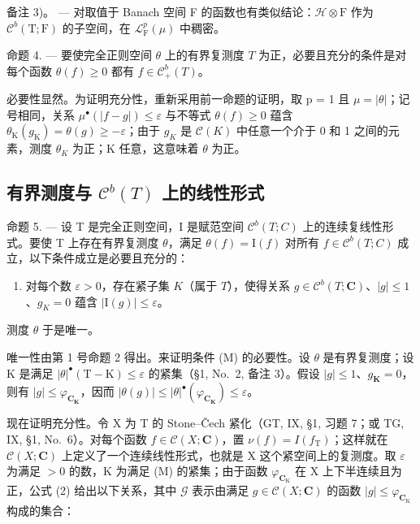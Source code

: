备注 3)。 --- 对取值于 Banach 空间 F 的函数也有类似结论：\(\mathcal{H} \otimes \mathrm{F}\) 作为 \(\mathcal{C}^b (\mathrm{T};\mathrm{F})\) 的子空间，在 \(\mathcal{L}_{\mathrm{F}}^{p}(\mu)\) 中稠密。

命题 4. --- 要使完全正则空间 \(\theta\) 上的有界复测度 \(T\) 为正，必要且充分的条件是对每个函数 \(\theta(f) \geqslant 0\) 都有 \(f \in \mathcal{C}_{+}^{b}(T)\)。

必要性显然。为证明充分性，重新采用前一命题的证明，取 p = 1 且 \(\mu = |\theta|\)；记号相同，关系 \(\mu^{\bullet}(|f - g|) \leqslant \varepsilon\) 与不等式 \(\theta(f) \geqslant 0\) 蕴含 \(\theta_{\mathrm{K}}(g_{\mathrm{K}}) = \theta(g) \geqslant -\varepsilon\)；由于 \(g_{K}\) 是 \(\mathcal{C}(K)\) 中任意一个介于 0 和 1 之间的元素，测度 \(\theta_{K}\) 为正；K 任意，这意味着 \(\theta\) 为正。

\subsection{\texorpdfstring{有界测度与 \(\mathcal{C}^{b}(T)\) 上的线性形式}{有界测度与 \textbackslash mathcal\{C\}\^{}\{b\}(T) 上的线性形式}}

命题 5. --- 设 T 是完全正则空间，I 是赋范空间 \(\mathcal{C}^{b}(T;C)\) 上的连续复线性形式。要使 T 上存在有界复测度 \(\theta\)，满足 \(\theta(f)=\mathrm{I}(f)\) 对所有 \(f\in\mathcal{C}^{b}(T;C)\) 成立，以下条件成立是必要且充分的：

\begin{enumerate}
\def\labelenumi{(\Alph{enumi})}
\setcounter{enumi}{12}
\tightlist
\item
  对每个数 \(\varepsilon > 0\)，存在紧子集 \(K\)（属于 \(T\)），使得关系 \(g \in \mathcal{C}^b(T; \mathbf{C})\)、\(|g| \leqslant 1\)、\(g_K = 0\) 蕴含 \(|\mathrm{I}(g)| \leqslant \varepsilon\)。
\end{enumerate}

测度 \(\theta\) 于是唯一。

唯一性由第 1 号命题 2 得出。来证明条件 (M) 的必要性。设 \(\theta\) 是有界复测度；设 K 是满足 \(|\theta|^{\bullet}(\mathrm{T}-\mathrm{K}) \leqslant \varepsilon\) 的紧集（§1, No.~2, 备注 3）。假设 \(|g| \leqslant 1\)、\(g_{\mathbf{K}} = 0\)，则有 \(|g| \leqslant \varphi_{\mathbf{C}_{\mathbf{K}}}\)，因而 \(|\theta(g)| \leqslant |\theta|^{\bullet}(\varphi_{\mathbf{C}_{\mathbf{K}}}) \leqslant \varepsilon\)。

现在证明充分性。令 X 为 T 的 Stone--Čech 紧化（GT, IX, §1, 习题 7；或 TG, IX, §1, No.~6）。对每个函数 \(f \in \mathcal{C}(X; \mathbf{C})\)，置 \(\nu(f) = I(f_{\mathrm{T}})\)；这样就在 \(\mathcal{C}(X; \mathbf{C})\) 上定义了一个连续线性形式，也就是 X 这个紧空间上的复测度。取 \(\varepsilon\) 为满足 \(>0\) 的数，K 为满足 (M) 的紧集；由于函数 \(\varphi_{\mathbf{C}_{\mathrm{K}}}\) 在 X 上下半连续且为正，公式 (2) 给出以下关系，其中 \(\mathcal{G}\) 表示由满足 \(g \in \mathcal{C}(X; \mathbf{C})\) 的函数 \(|g| \leqslant \varphi_{\mathbf{C}_{\mathrm{K}}}\) 构成的集合：

